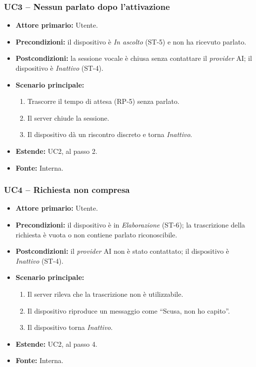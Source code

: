 \documentclass[12pt,a4paper]{article}
\newcommand{\tightlist}{\setlength{\itemsep}{1pt}\setlength{\parskip}{0pt}}
\begin{document}
\subsubsection{UC3 -- Nessun parlato dopo l'attivazione}
\begin{itemize}
\tightlist
\item \textbf{Attore primario:} Utente.
\item \textbf{Precondizioni:} il dispositivo è \emph{In ascolto} (ST-5) e non ha ricevuto parlato.
\item \textbf{Postcondizioni:} la sessione vocale è chiusa senza contattare il \emph{provider} AI; il dispositivo è \emph{Inattivo} (ST-4).
\item \textbf{Scenario principale:}
\begin{enumerate}
\tightlist
\item Trascorre il tempo di attesa (RP-5) senza parlato.
\item Il server chiude la sessione.
\item Il dispositivo dà un riscontro discreto e torna \emph{Inattivo}.
\end{enumerate}
\item \textbf{Estende:} UC2, al passo 2.
\item \textbf{Fonte:} Interna.
\end{itemize}

\subsubsection{UC4 -- Richiesta non compresa}
\begin{itemize}
\tightlist
\item \textbf{Attore primario:} Utente.
\item \textbf{Precondizioni:} il dispositivo è in \emph{Elaborazione} (ST-6); la trascrizione della richiesta è vuota o non contiene parlato riconoscibile.
\item \textbf{Postcondizioni:} il \emph{provider} AI non è stato contattato; il dispositivo è \emph{Inattivo} (ST-4).
\item \textbf{Scenario principale:}
\begin{enumerate}
\tightlist
\item Il server rileva che la trascrizione non è utilizzabile.
\item Il dispositivo riproduce un messaggio come ``Scusa, non ho capito''.
\item Il dispositivo torna \emph{Inattivo}.
\end{enumerate}
\item \textbf{Estende:} UC2, al passo 4.
\item \textbf{Fonte:} Interna.
\end{itemize}
\end{document}
